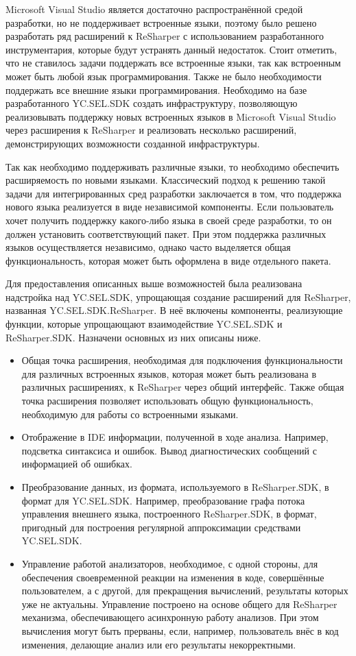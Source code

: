 Microsoft Visual Studio является достаточно распространённой средой разработки, но не поддерживает встроенные языки, поэтому было решено разработать ряд расширений к ReSharper с использованием разработанного инструментария, которые будут устранять данный недостаток. Стоит отметить, что не ставилось задачи поддержать все встроенные языки, так как встроенным может быть любой язык программирования. Также не было необходимости поддержать все внешние языки программирования. Необходимо на базе разработанного YC.SEL.SDK создать инфраструктуру, позволяющую реализовывать поддержку новых встроенных языков в Microsoft Visual Studio через расширения к ReSharper и реализовать несколько расширений, демонстрирующих возможности созданной инфраструктуры. 

Так как необходимо поддерживать различные языки, то необходимо обеспечить расширяемость по новыми языками. Классический подход к решению такой задачи для интегрированных сред разработки заключается в том, что поддержка нового языка реализуется в виде независимой компоненты. Если пользователь хочет получить поддержку какого-либо языка в своей среде разработки, то он должен установить соответствующий пакет. При этом поддержка различных языков осуществляется независимо, однако часто выделяется общая функциональность, которая может быть оформлена в виде отдельного пакета.

Для предоставления описанных выше возможностей была реализована надстройка над YC.SEL.SDK, упрощающая создание расширений для ReSharper, названная  YC.SEL.SDK.ReSharper. В неё включены компоненты, реализующие функции, которые упрощающают взаимодействие YC.SEL.SDK и ReSharper.SDK. Назначени основных из них описаны ниже.

\begin{itemize}
  \item Общая точка расширения, необходимая для подключения функциональности для различных встроенных языков, которая может быть реализована в различных расширениях, к ReSharper через общий интерфейс. Также общая точка расширения позволяет использовать общую функциональность, необходимую для работы со встроенными языками.
  \item Отображение в IDE информации, полученной в ходе анализа. Например, подсветка синтаксиса и ошибок. Вывод диагностических сообщений с информацией об ошибках.
  \item Преобразование данных, из формата, используемого в ReSharper.SDK, в формат для YC.SEL.SDK. Например, преобразование графа потока управления внешнего языка, построенного ReSharper.SDK, в формат, пригодный для построения регулярной аппроксимации средствами YC.SEL.SDK.
  \item Управление работой анализаторов, необходимое, с одной стороны, для обеспечения своевременной реакции на изменения в коде, совершённые пользователем, а с другой, для прекращения вычислений, результаты которых уже не актуальны. Управление построено на основе общего для ReSharper механизма, обеспечивающего асинхронную работу анализов. При этом вычисления могут быть прерваны, если, например, пользователь внёс в код изменения, делающие анализ или его результаты некорректными. 
\end{itemize}

